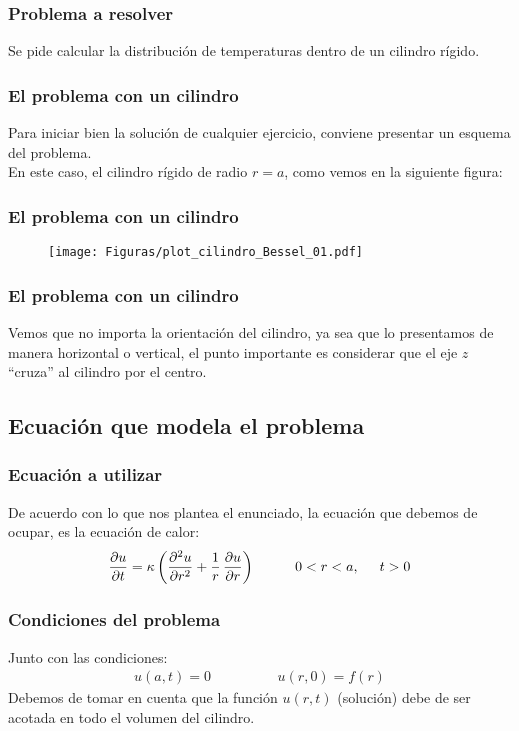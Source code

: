 \documentclass[12pt]{beamer}
\begin{document}
\begin{frame}
\frametitle{Problema a resolver}
Se pide calcular la distribución de temperaturas dentro de un cilindro rígido.
\end{frame}
\begin{frame}
\frametitle{El problema con un cilindro}
Para iniciar bien la solución de cualquier ejercicio, conviene presentar un esquema del problema.
\\
\bigskip
\pause
En este caso, el cilindro rígido de radio $r = a$, como vemos en la siguiente figura:
\end{frame}
\begin{frame}
\frametitle{El problema con un cilindro}
\begin{figure}[H]
    \centering
    \texttt{[image: Figuras/plot\_cilindro\_Bessel\_01.pdf]}
\end{figure}
\end{frame}
\begin{frame}
\frametitle{El problema con un cilindro}
Vemos que no importa la orientación del cilindro, ya sea que lo presentamos de manera horizontal o vertical, el punto importante es considerar que el eje $z$ \enquote{cruza} al cilindro por el centro.
\end{frame}

\subsection{Ecuación que modela el problema}

\begin{frame}
\frametitle{Ecuación a utilizar}
De acuerdo con lo que nos plantea el enunciado, la ecuación que debemos de ocupar, es la ecuación de calor:
\pause
\begin{align}
\pdv{u}{t} = \kappa \left( \pdv[2]{u}{r} + \dfrac{1}{r}  \, \pdv{u}{r} \right) \hspace{1cm} 0 < r < a, \hspace{0.5cm} t > 0
\label{eq:ecuacion_CilBessel_01}
\end{align}
\end{frame}
\begin{frame}
\frametitle{Condiciones del problema}
Junto con las condiciones:
\pause
\begin{align}
u (a, t) = 0 \hspace{2cm} u (r, 0) = f (r)
\label{eq:ecuacion_CilBessel_02}
\end{align}
Debemos de tomar en cuenta que la función $u (r, t)$ (solución) debe de ser acotada en todo el volumen del cilindro.
\end{frame}
\end{document}
